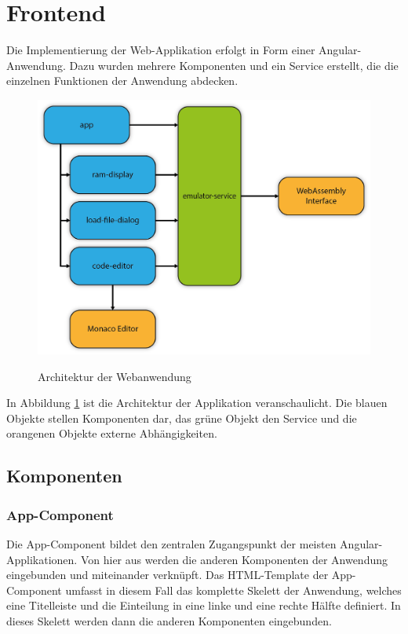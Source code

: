\section{Frontend}

Die Implementierung der Web-Applikation erfolgt in Form einer Angular-Anwendung. Dazu wurden mehrere Komponenten und ein Service erstellt, die die einzelnen Funktionen der Anwendung abdecken.

\begin{figure}
    \caption{Architektur der Webanwendung}
    \centering
    \includegraphics[width=1.0\textwidth]{Bilder/AngularArchitektur.png}
    \label{fig:architecture}
\end{figure}

In Abbildung \ref{fig:architecture} ist die Architektur der Applikation veranschaulicht. Die blauen Objekte stellen Komponenten dar, das grüne Objekt den Service und die orangenen Objekte externe Abhängigkeiten.

\subsection{Komponenten}

\subsubsection{App-Component}

Die App-Component bildet den zentralen Zugangspunkt der meisten Angular-Applikationen. Von hier aus werden die anderen Komponenten der Anwendung eingebunden und miteinander verknüpft.
Das HTML-Template der App-Component umfasst in diesem Fall das komplette Skelett der Anwendung, welches eine Titelleiste und die Einteilung in eine linke und eine rechte Hälfte definiert.
In dieses Skelett werden dann die anderen Komponenten eingebunden.

